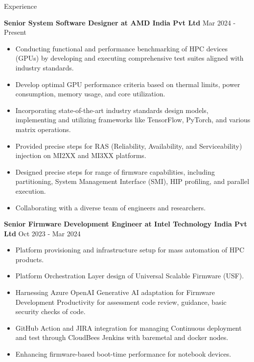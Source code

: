 \documentclass{resume} %
\begin{document}


\begin{rSection}{Experience}

{\bf Senior System Software Designer at AMD India Pvt Ltd} \hfill {Mar 2024 - Present }
\begin{itemize}
    \item Conducting functional and performance benchmarking of HPC devices (GPUs) by developing and executing comprehensive test suites aligned with industry standards.
    \item Develop optimal GPU performance criteria based on thermal limits, power consumption, memory usage, and core utilization.
    \item Incorporating state-of-the-art industry standards design models, implementing and utilizing frameworks like TensorFlow, PyTorch, and various matrix operations.
    \item Provided precise steps for RAS (Reliability, Availability, and Serviceability) injection on MI2XX and MI3XX platforms.
    \item Designed precise steps for range of firmware capabilities, including partitioning, System Management Interface (SMI), HIP profiling, and parallel execution.
    \item Collaborating with a diverse team of engineers and researchers.
    
\end{itemize}

{\textbf{Senior Firmware Development Engineer at Intel Technology India Pvt Ltd}}  \hfill {Oct 2023 - Mar 2024}
\begin{itemize}
    \item Platform provisioning and infrastructure setup for mass automation of HPC products.
    \item Platform Orchestration Layer design of Universal Scalable Firmware (USF).
    \item Harnessing Azure OpenAI Generative AI adaptation for Firmware Development Productivity for assessment code review, guidance, basic security checks of code.
    \item GitHub Action and JIRA integration for managing Continuous deployment and test through CloudBees Jenkins with baremetal and docker nodes.
    \item Enhancing firmware-based boot-time performance for notebook devices.
\end{itemize}
 

\end{rSection}
\end{document}
